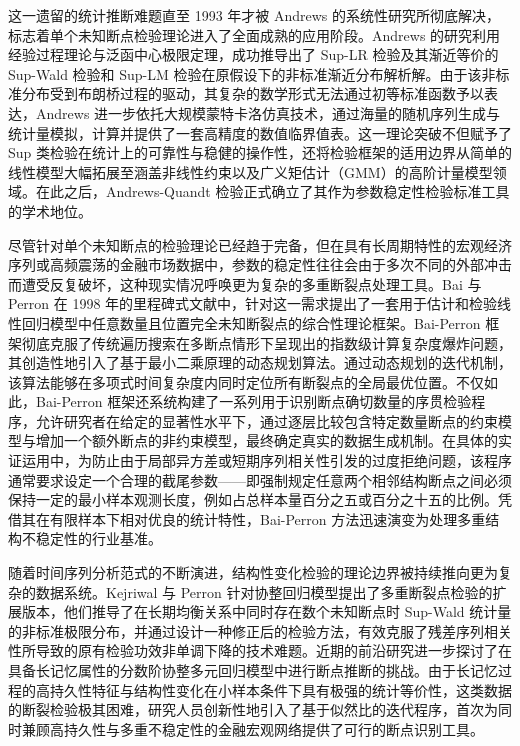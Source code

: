 这一遗留的统计推断难题直至 1993 年才被 Andrews 的系统性研究所彻底解决，标志着单个未知断点检验理论进入了全面成熟的应用阶段。Andrews 的研究利用经验过程理论与泛函中心极限定理，成功推导出了 Sup-LR 检验及其渐近等价的 Sup-Wald 检验和 Sup-LM 检验在原假设下的非标准渐近分布解析解。由于该非标准分布受到布朗桥过程的驱动，其复杂的数学形式无法通过初等标准函数予以表达，Andrews 进一步依托大规模蒙特卡洛仿真技术，通过海量的随机序列生成与统计量模拟，计算并提供了一套高精度的数值临界值表。这一理论突破不但赋予了 Sup 类检验在统计上的可靠性与稳健的操作性，还将检验框架的适用边界从简单的线性模型大幅拓展至涵盖非线性约束以及广义矩估计（GMM）的高阶计量模型领域。在此之后，Andrews-Quandt 检验正式确立了其作为参数稳定性检验标准工具的学术地位。

尽管针对单个未知断点的检验理论已经趋于完备，但在具有长周期特性的宏观经济序列或高频震荡的金融市场数据中，参数的稳定性往往会由于多次不同的外部冲击而遭受反复破坏，这种现实情况呼唤更为复杂的多重断裂点处理工具。Bai 与 Perron 在 1998 年的里程碑式文献中，针对这一需求提出了一套用于估计和检验线性回归模型中任意数量且位置完全未知断裂点的综合性理论框架。Bai-Perron 框架彻底克服了传统遍历搜索在多断点情形下呈现出的指数级计算复杂度爆炸问题，其创造性地引入了基于最小二乘原理的动态规划算法。通过动态规划的迭代机制，该算法能够在多项式时间复杂度内同时定位所有断裂点的全局最优位置。不仅如此，Bai-Perron 框架还系统构建了一系列用于识别断点确切数量的序贯检验程序，允许研究者在给定的显著性水平下，通过逐层比较包含特定数量断点的约束模型与增加一个额外断点的非约束模型，最终确定真实的数据生成机制。在具体的实证运用中，为防止由于局部异方差或短期序列相关性引发的过度拒绝问题，该程序通常要求设定一个合理的截尾参数——即强制规定任意两个相邻结构断点之间必须保持一定的最小样本观测长度，例如占总样本量百分之五或百分之十五的比例。凭借其在有限样本下相对优良的统计特性，Bai-Perron 方法迅速演变为处理多重结构不稳定性的行业基准。

随着时间序列分析范式的不断演进，结构性变化检验的理论边界被持续推向更为复杂的数据系统。Kejriwal 与 Perron 针对协整回归模型提出了多重断裂点检验的扩展版本，他们推导了在长期均衡关系中同时存在数个未知断点时 Sup-Wald 统计量的非标准极限分布，并通过设计一种修正后的检验方法，有效克服了残差序列相关性所导致的原有检验功效非单调下降的技术难题。近期的前沿研究进一步探讨了在具备长记忆属性的分数阶协整多元回归模型中进行断点推断的挑战。由于长记忆过程的高持久性特征与结构性变化在小样本条件下具有极强的统计等价性，这类数据的断裂检验极其困难，研究人员创新性地引入了基于似然比的迭代程序，首次为同时兼顾高持久性与多重不稳定性的金融宏观网络提供了可行的断点识别工具。


